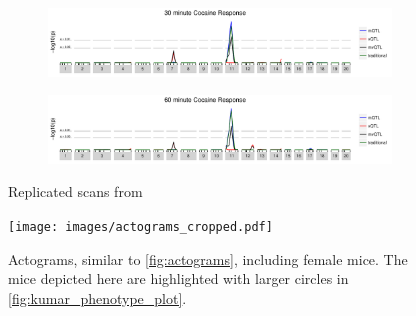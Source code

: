         \begin{figure}[h]
            \begin{subfigure}{\textwidth}
                \includegraphics[width=\textwidth]{images/Kumar_cocaine30_scan.pdf}
            \end{subfigure}
            \begin{subfigure}{\textwidth}
                \includegraphics[width=\textwidth]{images/Kumar_cocaine60_scan.pdf}
            \end{subfigure}
          \caption{Replicated scans from \cite{Kumar2013}}
          \label{fig:replicate_kumar}
        \end{figure}

        \begin{figure}[h]
            \centering
            \texttt{[image: images/actograms\_cropped.pdf]}
            \caption{
                Actograms, similar to \autoref{fig:actograms}, including female mice.
                The mice depicted here are highlighted with larger circles in \autoref{fig:kumar_phenotype_plot}.
            }
            \label{fig:actogram_supp}
        \end{figure}

